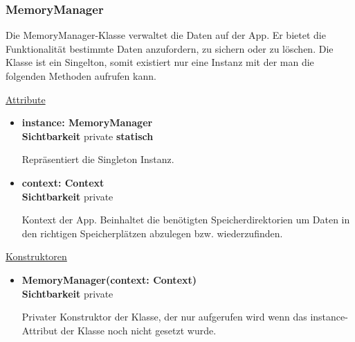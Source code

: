 \subsubsection{MemoryManager} \label{app:klasse:MemoryManager}
Die MemoryManager-Klasse verwaltet die Daten auf der App. Er bietet die Funktionalität bestimmte Daten anzufordern, zu sichern oder zu löschen. Die Klasse ist ein Singelton, somit existiert nur eine Instanz mit der man die folgenden Methoden aufrufen kann.\newline

\underline{Attribute}
\begin{itemize}
\itemsep0pt
\item \textbf{instance: MemoryManager} \hfill\\ 
\textbf{Sichtbarkeit} private \newline
\textbf{statisch} 

Repräsentiert die Singleton Instanz.

\item \textbf{context: Context} \hfill\\ 
\textbf{Sichtbarkeit} private

Kontext der App. Beinhaltet die benötigten Speicherdirektorien um Daten in den richtigen Speicherplätzen abzulegen bzw. wiederzufinden.
\end{itemize}

\underline{Konstruktoren}
\begin{itemize}
\itemsep0pt
\item \textbf{MemoryManager(context: Context)} \hfill\\
\textbf{Sichtbarkeit} private

Privater Konstruktor der Klasse, der nur aufgerufen wird wenn das instance-Attribut der Klasse noch nicht gesetzt wurde.
\end{itemize}

